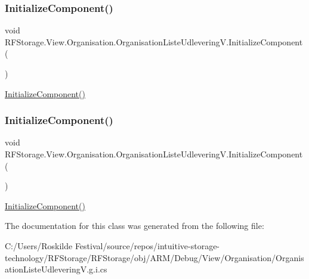 \subsubsection{\texorpdfstring{InitializeComponent()}{InitializeComponent()}\hspace{0.1cm}{\footnotesize\ttfamily [7/8]}}
{\footnotesize\ttfamily void R\+F\+Storage.\+View.\+Organisation.\+Organisation\+Liste\+Udlevering\+V.\+Initialize\+Component (\begin{DoxyParamCaption}{ }\end{DoxyParamCaption})}



\mbox{\hyperlink{class_r_f_storage_1_1_view_1_1_organisation_1_1_organisation_liste_udlevering_v_a696d504863e3dfaefd07879d4224ce2e}{Initialize\+Component()}} 

\mbox{\label{class_r_f_storage_1_1_view_1_1_organisation_1_1_organisation_liste_udlevering_v_a696d504863e3dfaefd07879d4224ce2e}} 
\subsubsection{\texorpdfstring{InitializeComponent()}{InitializeComponent()}\hspace{0.1cm}{\footnotesize\ttfamily [8/8]}}
{\footnotesize\ttfamily void R\+F\+Storage.\+View.\+Organisation.\+Organisation\+Liste\+Udlevering\+V.\+Initialize\+Component (\begin{DoxyParamCaption}{ }\end{DoxyParamCaption})}



\mbox{\hyperlink{class_r_f_storage_1_1_view_1_1_organisation_1_1_organisation_liste_udlevering_v_a696d504863e3dfaefd07879d4224ce2e}{Initialize\+Component()}} 



The documentation for this class was generated from the following file\+:\begin{DoxyCompactItemize}
\item 
C\+:/\+Users/\+Roskilde Festival/source/repos/intuitive-\/storage-\/technology/\+R\+F\+Storage/\+R\+F\+Storage/obj/\+A\+R\+M/\+Debug/\+View/\+Organisation/Organisation\+Liste\+Udlevering\+V.\+g.\+i.\+cs\end{DoxyCompactItemize}
